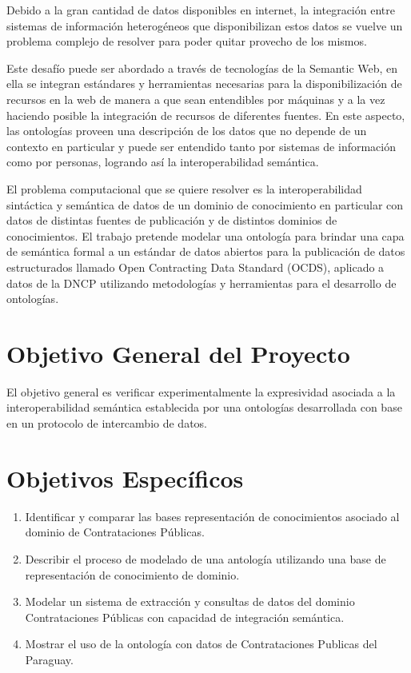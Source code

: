 Debido a la gran cantidad de datos disponibles en internet, la integración entre sistemas de información heterogéneos que disponibilizan estos datos se vuelve un problema complejo de resolver para poder quitar provecho de los mismos. 

Este desafío puede ser abordado a través de tecnologías de la Semantic Web, en ella se integran estándares y herramientas necesarias para la disponibilización de recursos en la web de manera a que sean entendibles por máquinas y a la vez haciendo posible la integración de recursos de diferentes fuentes. En este aspecto, las ontologías proveen una descripción de los datos que no depende de un contexto en particular y puede ser entendido tanto por sistemas de información como por personas, logrando así la interoperabilidad semántica.

El problema computacional que se quiere resolver es la interoperabilidad sintáctica y semántica de datos de un dominio de conocimiento en particular con datos de distintas fuentes de publicación y de distintos dominios de conocimientos. El trabajo pretende modelar una ontología para brindar una capa de semántica formal a un estándar de datos abiertos para la publicación de datos estructurados llamado Open Contracting Data Standard (OCDS), aplicado a datos de la DNCP utilizando metodologías y herramientas para el desarrollo de ontologías. 


\section{Objetivo General del Proyecto}

El objetivo general es verificar experimentalmente la expresividad asociada a la interoperabilidad semántica establecida por una ontologías desarrollada con base en un protocolo de intercambio de datos.


\section{Objetivos Específicos}
\label{objetivos especiicos}

\begin{enumerate}
    \item \label{obj:1}  Identificar y comparar las bases representación de conocimientos asociado al dominio de Contrataciones Públicas.
    \item \label{obj:2}  Describir el proceso de modelado de una antología utilizando una base de representación de conocimiento de dominio.
    \item \label{obj:3}  Modelar un sistema de extracción y consultas de datos del dominio Contrataciones Públicas con capacidad de integración semántica.
    \item \label{obj:4}  Mostrar el uso de la ontología con datos de Contrataciones Publicas del Paraguay.
\end{enumerate} 


